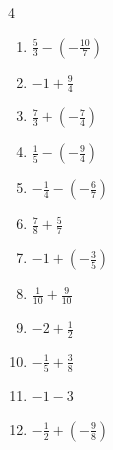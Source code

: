 \begin{multicols}{4}
\begin{enumerate}

  \item $\displaystyle \frac{5}{3} - \left(-\frac{10}{7}\right)$


  \item $\displaystyle -1 + \frac{9}{4}$


  \item $\displaystyle \frac{7}{3} + \left(-\frac{7}{4}\right)$


  \item $\displaystyle \frac{1}{5} - \left(-\frac{9}{4}\right)$


  \item $\displaystyle -\frac{1}{4} - \left(-\frac{6}{7}\right)$


  \item $\displaystyle \frac{7}{8} + \frac{5}{7}$


  \item $\displaystyle -1 + \left(-\frac{3}{5}\right)$


  \item $\displaystyle \frac{1}{10} + \frac{9}{10}$

        \phantom{$\displaystyle =1$}

\columnbreak %

  \item $\displaystyle -2 + \frac{1}{2}$


  \item $\displaystyle -\frac{1}{5} + \frac{3}{8}$


  \item $\displaystyle -1 - 3$

        \phantom{$\displaystyle =-4$}

  \item $\displaystyle -\frac{1}{2} + \left(-\frac{9}{8}\right)$


\end{enumerate}
\end{multicols}
